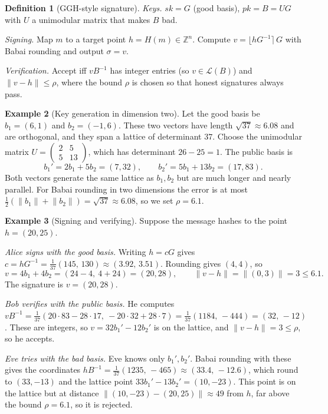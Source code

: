 \documentclass[11pt,a4paper]{article}
\theoremstyle{definition}
\newtheorem{definition}{Definition}[section]
\newtheorem{example}[definition]{Example}
\newcommand{\Z}{\mathbb{Z}}
\newcommand{\sk}{\mathit{sk}}
\newcommand{\pk}{\mathit{pk}}
\newcommand{\Hash}{H}
\newcommand{\norm}[1]{\lVert #1\rVert}
\begin{document}
\begin{definition}[GGH-style signature]
\emph{Keys.} $\sk=G$ (good basis), $\pk=B=UG$ with $U$ a unimodular matrix that makes $B$ bad.

\emph{Signing.} Map $m$ to a target point $h=\Hash(m)\in\Z^n$. Compute $v=\lfloor hG^{-1}\rceil\,G$ with Babai rounding and output $\sigma=v$.

\emph{Verification.} Accept iff $vB^{-1}$ has integer entries (so $v\in\mathcal{L}(B)$) and $\norm{v-h}\le\rho$, where the bound $\rho$ is chosen so that honest signatures always pass.
\end{definition}

\begin{example}[Key generation in dimension two]\label{ex:ggh-key}
Let the good basis be $b_1=(6,1)$ and $b_2=(-1,6)$. These two vectors have length $\sqrt{37}\approx 6.08$ and are orthogonal, and they span a lattice of determinant $37$. Choose the unimodular matrix $U=\begin{pmatrix}2&5\\5&13\end{pmatrix}$, which has determinant $26-25=1$. The public basis is
\[
b_1'=2b_1+5b_2=(7,32),\qquad b_2'=5b_1+13b_2=(17,83).
\]
Both vectors generate the same lattice as $b_1,b_2$ but are much longer and nearly parallel. For Babai rounding in two dimensions the error is at most $\tfrac12(\norm{b_1}+\norm{b_2})=\sqrt{37}\approx 6.08$, so we set $\rho=6.1$.
\end{example}

\begin{example}[Signing and verifying]\label{ex:ggh-sign}
Suppose the message hashes to the point $h=(20,25)$.

\emph{Alice signs with the good basis.} Writing $h=cG$ gives $c=hG^{-1}=\tfrac1{37}(145,\,130)\approx(3.92,\,3.51)$. Rounding gives $(4,4)$, so
\[
v=4b_1+4b_2=(24-4,\ 4+24)=(20,28),\qquad \norm{v-h}=\norm{(0,3)}=3\le 6.1.
\]
The signature is $v=(20,28)$.

\emph{Bob verifies with the public basis.} He computes $vB^{-1}=\tfrac1{37}(20\cdot 83-28\cdot 17,\ -20\cdot 32+28\cdot 7)=\tfrac1{37}(1184,\,-444)=(32,\,-12)$. These are integers, so $v=32b_1'-12b_2'$ is on the lattice, and $\norm{v-h}=3\le\rho$, so he accepts.

\emph{Eve tries with the bad basis.} Eve knows only $b_1',b_2'$. Babai rounding with these gives the coordinates $hB^{-1}=\tfrac1{37}(1235,\,-465)\approx(33.4,\,-12.6)$, which round to $(33,-13)$ and the lattice point $33b_1'-13b_2'=(10,-23)$. This point is on the lattice but at distance $\norm{(10,-23)-(20,25)}\approx 49$ from $h$, far above the bound $\rho=6.1$, so it is rejected.
\end{example}
\end{document}
